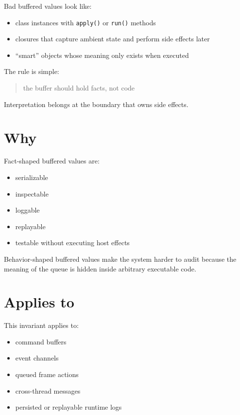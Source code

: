 Bad buffered values look like:

\begin{itemize}
\tightlist
\item
  class instances with \texttt{a\allowbreak{}p\allowbreak{}p\allowbreak{}l\allowbreak{}y\allowbreak{}(\allowbreak{})} or \texttt{r\allowbreak{}u\allowbreak{}n\allowbreak{}(\allowbreak{})} methods
\item
  closures that capture ambient state and perform side effects later
\item
  ``smart'' objects whose meaning only exists when executed
\end{itemize}

The rule is simple:

\begin{quote}
the buffer should hold facts, not code
\end{quote}

Interpretation belongs at the boundary that owns side effects.

\section{Why}\label{record-036-why}

Fact-shaped buffered values are:

\begin{itemize}
\tightlist
\item
  serializable
\item
  inspectable
\item
  loggable
\item
  replayable
\item
  testable without executing host effects
\end{itemize}

Behavior-shaped buffered values make the system harder to audit because the meaning of the queue is hidden inside arbitrary executable code.

\section{Applies to}\label{record-036-applies-to}

This invariant applies to:

\begin{itemize}
\tightlist
\item
  command buffers
\item
  event channels
\item
  queued frame actions
\item
  cross-thread messages
\item
  persisted or replayable runtime logs
\end{itemize}

